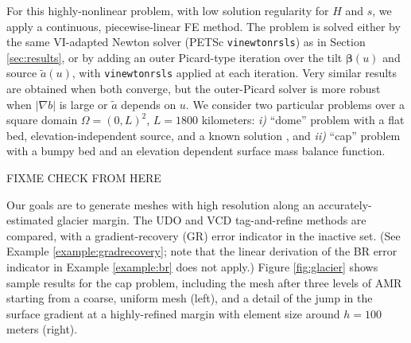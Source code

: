 \documentclass[]{interact}
\theoremstyle{plain}%
\theoremstyle{definition}
\theoremstyle{remark}
\newcommand{\grad}{\nabla}
\begin{document}
For this highly-nonlinear problem, with low solution regularity for $H$ and $s$, we apply a continuous, piecewise-linear FE method.  The problem is solved either by the same VI-adapted Newton solver (PETSc \texttt{vinewtonrsls}) as in Section \ref{sec:results}, or by adding an outer Picard-type iteration over the tilt $\bm{\beta}(u)$ \cite{JouvetBueler2012} and source $\tilde a(u)$, with \texttt{vinewtonrsls} applied at each iteration.  Very similar results are obtained when both converge, but the outer-Picard solver is more robust when $|\grad b|$ is large or $\tilde a$ depends on $u$.  We consider two particular problems over a square domain $\Omega=(0,L)^2$, $L=1800$ kilometers: \emph{i)} ``dome'' problem with a flat bed, elevation-independent source, and a known solution \cite{Bueler2016}, and \emph{ii)} ``cap'' problem with a bumpy bed \cite[Example 8.4]{BuelerFarrell2024} and an elevation dependent surface mass balance function.

FIXME CHECK FROM HERE

Our goals are to generate meshes with high resolution along an accurately-estimated glacier margin.  The UDO and VCD tag-and-refine methods are compared, with a gradient-recovery (GR) error indicator in the inactive set.  (See Example \ref{example:gradrecovery}; note that the linear derivation of the BR error indicator in Example \ref{example:br} does not apply.)  Figure \ref{fig:glacier} shows sample results for the cap problem, including the mesh after three levels of AMR starting from a coarse, uniform mesh (left), and a detail of the jump in the surface gradient at a highly-refined margin with element size around $h = 100$ meters (right).
\end{document}
